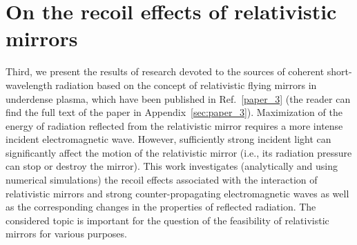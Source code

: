 \documentclass[10pt, a4paper, twoside, openright]{report}
\begin{document}
\section{On the recoil effects of relativistic mirrors\label{sec:on_the_recoil_effects_of_relativistic_mirrors}}
%

Third, we present the results of research devoted to the sources of coherent short-wavelength radiation based on the concept of relativistic flying mirrors in underdense plasma, which have been published in Ref.~\ref{paper_3} (the reader can find the full text of the paper in Appendix~\ref{sec:paper_3}). Maximization of the energy of radiation reflected from the relativistic mirror requires a more intense incident electromagnetic wave. However, sufficiently strong incident light can significantly affect the motion of the relativistic mirror (i.e., its radiation pressure can stop or destroy the mirror). This work investigates (analytically and using numerical simulations) the recoil effects associated with the interaction of relativistic mirrors and strong counter-propagating electromagnetic waves as well as the corresponding changes in the properties of reflected radiation. The considered topic is important for the question of the feasibility of relativistic mirrors for various purposes.

\end{document}
